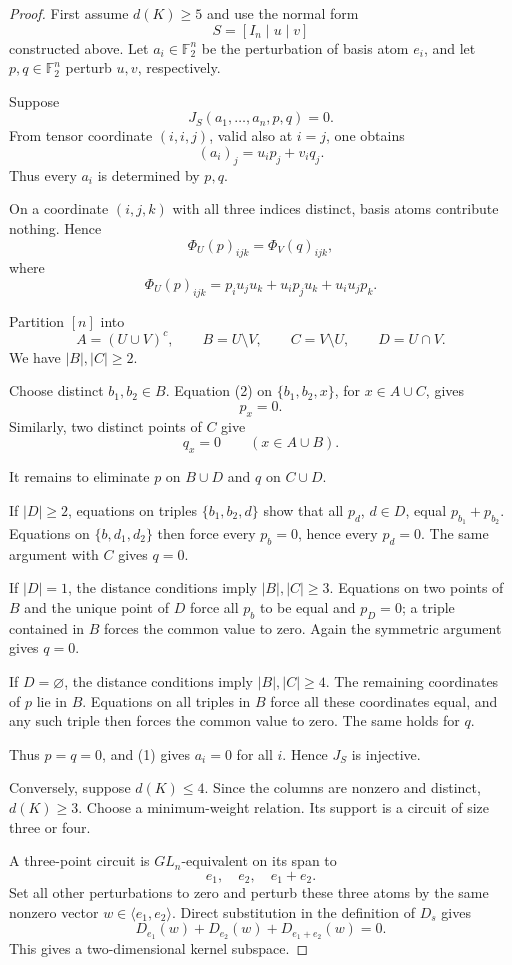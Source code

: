\documentclass[11pt]{article}
\theoremstyle{definition}
\newcommand{\F}{\mathbb F}
\begin{document}
\begin{proof}
First assume \(d(K)\ge5\) and use the normal form
\[
S=[I_n\mid u\mid v]
\]
constructed above. Let \(a_i\in\F_2^n\) be the perturbation of basis atom \(e_i\), and let \(p,q\in\F_2^n\) perturb \(u,v\), respectively.

Suppose
\[
J_S(a_1,\ldots,a_n,p,q)=0.
\]
From tensor coordinate \((i,i,j)\), valid also at \(i=j\), one obtains
\[
(a_i)_j=u_i p_j+v_i q_j. \tag{1}
\]
Thus every \(a_i\) is determined by \(p,q\).

On a coordinate \((i,j,k)\) with all three indices distinct, basis atoms contribute nothing. Hence
\[
\Phi_U(p)_{ijk}=\Phi_V(q)_{ijk}, \tag{2}
\]
where
\[
\Phi_U(p)_{ijk}
=
p_i u_j u_k
+
u_i p_j u_k
+
u_i u_j p_k.
\]

Partition \([n]\) into
\[
A=(U\cup V)^c,\qquad
B=U\setminus V,\qquad
C=V\setminus U,\qquad
D=U\cap V.
\]
We have \(|B|,|C|\ge2\).

Choose distinct \(b_1,b_2\in B\). Equation (2) on \(\{b_1,b_2,x\}\), for \(x\in A\cup C\), gives
\[
p_x=0.
\]
Similarly, two distinct points of \(C\) give
\[
q_x=0
\qquad(x\in A\cup B).
\]

It remains to eliminate \(p\) on \(B\cup D\) and \(q\) on \(C\cup D\).

If \(|D|\ge2\), equations on triples \(\{b_1,b_2,d\}\) show that all \(p_d\), \(d\in D\), equal \(p_{b_1}+p_{b_2}\). Equations on \(\{b,d_1,d_2\}\) then force every \(p_b=0\), hence every \(p_d=0\). The same argument with \(C\) gives \(q=0\).

If \(|D|=1\), the distance conditions imply \(|B|,|C|\ge3\). Equations on two points of \(B\) and the unique point of \(D\) force all \(p_b\) to be equal and \(p_D=0\); a triple contained in \(B\) forces the common value to zero. Again the symmetric argument gives \(q=0\).

If \(D=\varnothing\), the distance conditions imply \(|B|,|C|\ge4\). The remaining coordinates of \(p\) lie in \(B\). Equations on all triples in \(B\) force all these coordinates equal, and any such triple then forces the common value to zero. The same holds for \(q\).

Thus \(p=q=0\), and (1) gives \(a_i=0\) for all \(i\). Hence \(J_S\) is injective.

Conversely, suppose \(d(K)\le4\). Since the columns are nonzero and distinct, \(d(K)\ge3\). Choose a minimum-weight relation. Its support is a circuit of size three or four.

A three-point circuit is \(GL_n\)-equivalent on its span to
\[
e_1,\quad e_2,\quad e_1+e_2.
\]
Set all other perturbations to zero and perturb these three atoms by the same nonzero vector \(w\in\langle e_1,e_2\rangle\). Direct substitution in the definition of \(D_s\) gives
\[
D_{e_1}(w)+D_{e_2}(w)+D_{e_1+e_2}(w)=0.
\]
This gives a two-dimensional kernel subspace.


\end{proof}
\end{document}
